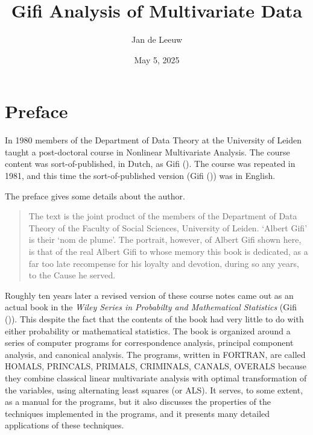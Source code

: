 \documentclass[
  12pt,
  letterpaper,
]{scrbook}
\title{Gifi Analysis of Multivariate Data}
\author{Jan de Leeuw}
\date{May 5, 2025}
\renewcommand*\contentsname{Table of contents}
\newcommand\contentsname{Table of contents}
\begin{document}
\frontmatter
\maketitle

\renewcommand*\contentsname{Table of contents}
{
\setcounter{tocdepth}{2}
\tableofcontents
}

\mainmatter
{}

\chapter*{Preface}\label{preface}


In 1980 members of the Department of Data Theory at the University of
Leiden taught a post-doctoral course in Nonlinear Multivariate Analysis.
The course content was sort-of-published, in Dutch, as Gifi
(). The course was repeated in 1981, and
this time the sort-of-published version (Gifi
()) was in English.

The preface gives some details about the author.

\begin{quote}
The text is the joint product of the members of the Department of Data
Theory of the Faculty of Social Sciences, University of Leiden. `Albert
Gifi' is their `nom de plume'. The portrait, however, of Albert Gifi
shown here, is that of the real Albert Gifi to whose memory this book is
dedicated, as a far too late recompense for his loyalty and devotion,
during so any years, to the Cause he served.
\end{quote}

Roughly ten years later a revised version of these course notes came out
as an actual book in the \emph{Wiley Series in Probabilty and
Mathematical Statistics} (Gifi ()). This
despite the fact that the contents of the book had very little to do
with either probability or mathematical statistics. The book is
organized around a series of computer programs for correspondence
analysis, principal component analysis, and canonical analysis. The
programs, written in FORTRAN, are called HOMALS, PRINCALS, PRIMALS,
CRIMINALS, CANALS, OVERALS because they combine classical linear
multivariate analysis with optimal transformation of the variables,
using alternating least squares (or ALS). It serves, to some extent, as
a manual for the programs, but it also discusses the properties of the
techniques implemented in the programs, and it presents many detailed
applications of these techniques.
\end{document}
